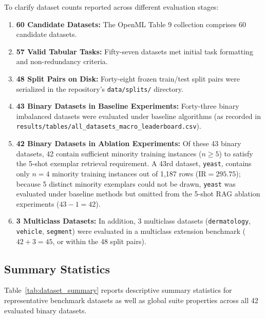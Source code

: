 \documentclass[sn-basic]{sn-jnl}
\begin{document}
To clarify dataset counts reported across different evaluation stages:
\begin{enumerate}
    \item \textbf{60 Candidate Datasets:} The OpenML Table 9 collection comprises 60 candidate datasets.
    \item \textbf{57 Valid Tabular Tasks:} Fifty-seven datasets met initial task formatting and non-redundancy criteria.
    \item \textbf{48 Split Pairs on Disk:} Forty-eight frozen train/test split pairs were serialized in the repository's \texttt{data/splits/} directory.
    \item \textbf{43 Binary Datasets in Baseline Experiments:} Forty-three binary imbalanced datasets were evaluated under baseline algorithms (as recorded in \texttt{results/tables/all\_datasets\_macro\_leaderboard.csv}).
    \item \textbf{42 Binary Datasets in Ablation Experiments:} Of these 43 binary datasets, 42 contain sufficient minority training instances ($n \ge 5$) to satisfy the 5-shot exemplar retrieval requirement. A 43rd dataset, \texttt{yeast}, contains only $n = 4$ minority training instances out of 1,187 rows ($\text{IR} = 295.75$); because 5 distinct minority exemplars could not be drawn, \texttt{yeast} was evaluated under baseline methods but omitted from the 5-shot RAG ablation experiments ($43 - 1 = 42$).
    \item \textbf{3 Multiclass Datasets:} In addition, 3 multiclass datasets (\texttt{dermatology}, \texttt{vehicle}, \texttt{segment}) were evaluated in a multiclass extension benchmark ($42 + 3 = 45$, or within the 48 split pairs).
\end{enumerate}

\subsection{Summary Statistics}
Table~\ref{tab:dataset_summary} reports descriptive summary statistics for representative benchmark datasets as well as global suite properties across all 42 evaluated binary datasets.
\end{document}
